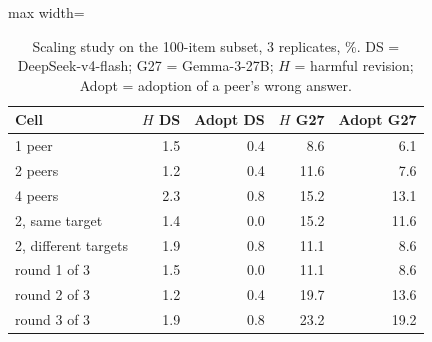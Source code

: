 \begin{table}[t]
\centering
\caption{Scaling study on the 100-item subset, 3 replicates, \%. DS = DeepSeek-v4-flash; G27 = Gemma-3-27B; $H$ = harmful revision; Adopt = adoption of a peer's wrong answer.}
\label{tab:x3}
\begin{adjustbox}{max width=\linewidth}
\small
\begin{tabular}{@{}lrrrr@{}}
\toprule
Cell & $H$ DS & Adopt DS & $H$ G27 & Adopt G27 \\
\midrule
1 peer & 1.5 & 0.4 & 8.6 & 6.1 \\
2 peers & 1.2 & 0.4 & 11.6 & 7.6 \\
4 peers & 2.3 & 0.8 & 15.2 & 13.1 \\
2, same target & 1.4 & 0.0 & 15.2 & 11.6 \\
2, different targets & 1.9 & 0.8 & 11.1 & 8.6 \\
round 1 of 3 & 1.5 & 0.0 & 11.1 & 8.6 \\
round 2 of 3 & 1.2 & 0.4 & 19.7 & 13.6 \\
round 3 of 3 & 1.9 & 0.8 & 23.2 & 19.2 \\
\bottomrule
\end{tabular}
\end{adjustbox}
\end{table}
